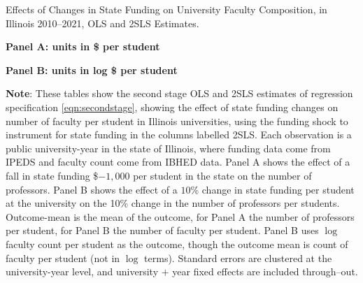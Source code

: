 \newpage
\begin{table}[H]
    \singlespacing
    \centering
    \caption{Effects of Changes in State Funding on University Faculty Composition, in Illinois 2010--2021, OLS and 2SLS Estimates.}

    \textbf{Panel A: units in \$ per student}

    \makebox[\textwidth][c]{}
    
    \textbf{Panel B: units in log \$ per student}
    
    \makebox[\textwidth][c]{}

    \label{tab:facultycount-illinois-reg}
    \justify
    \footnotesize
    \textbf{Note}:
    These tables show the second stage OLS and 2SLS estimates of regression specification \eqref{eqn:secondstage}, showing the effect of state funding changes on number of faculty per student in Illinois universities, using the funding shock to instrument for state funding in the columns labelled 2SLS.
    Each observation is a public university-year in the state of Illinois, where funding data come from IPEDS and faculty count come from IBHED data.
    Panel A shows the effect of a fall in state funding \$$-1,000$ per student in the state on the number of professors.
    Panel B shows the effect of a $10$\% change in state funding per student at the university on the 10\% change in the number of professors per students.
    Outcome-mean is the mean of the outcome, for Panel A the number of professors per student, for Panel B the number of faculty per student.
    Panel B uses $\log$ faculty count per student as the outcome, though the outcome mean is count of faculty per student (not in $\log$ terms).
    Standard errors are clustered at the university-year level, and university $+$ year fixed effects are included through--out.
\end{table}

